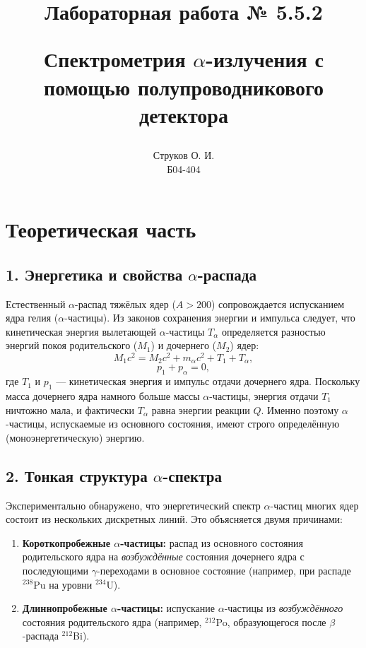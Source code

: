 \documentclass[12pt, a4paper]{article}
\begin{document}
\title{\begin{center}Лабораторная работа № 5.5.2\end{center}
Спектрометрия $\alpha$-излучения с помощью
полупроводникового детектора}
\author{Струков О. И. \\ Б04-404}
\date{}

\thispagestyle{empty}
\maketitle
\newpage
{}



\section*{Теоретическая часть}

\subsection*{1. Энергетика и свойства $\alpha$-распада}
Естественный $\alpha$-распад тяжёлых ядер ($A > 200$) сопровождается испусканием ядра гелия ($\alpha$-частицы). Из законов сохранения энергии и импульса следует, что кинетическая энергия вылетающей $\alpha$-частицы $T_\alpha$ определяется разностью энергий покоя родительского ($M_1$) и дочернего ($M_2$) ядер:
\begin{equation}
    M_1 c^2 = M_2 c^2 + m_\alpha c^2 + T_1 + T_\alpha,
\end{equation}
\begin{equation}
    p_1 + p_\alpha = 0,
\end{equation}
где $T_1$ и $p_1$ --- кинетическая энергия и импульс отдачи дочернего ядра. Поскольку масса дочернего ядра намного больше массы $\alpha$-частицы, энергия отдачи $T_1$ ничтожно мала, и фактически $T_\alpha$ равна энергии реакции $Q$. Именно поэтому $\alpha$-частицы, испускаемые из основного состояния, имеют строго определённую (моноэнергетическую) энергию.

\subsection*{2. Тонкая структура $\alpha$-спектра}
Экспериментально обнаружено, что энергетический спектр $\alpha$-частиц многих ядер состоит из нескольких дискретных линий. Это объясняется двумя причинами:
\begin{enumerate}
    \item \textbf{Короткопробежные $\alpha$-частицы:} распад из основного состояния родительского ядра на \textit{возбуждённые} состояния дочернего ядра с последующими $\gamma$-переходами в основное состояние (например, при распаде $^{238}$Pu на уровни $^{234}$U).
    \item \textbf{Длиннопробежные $\alpha$-частицы:} испускание $\alpha$-частицы из \textit{возбуждённого} состояния родительского ядра (например, $^{212}$Po, образующегося после $\beta$-распада $^{212}$Bi).
\end{enumerate}
\end{document}
